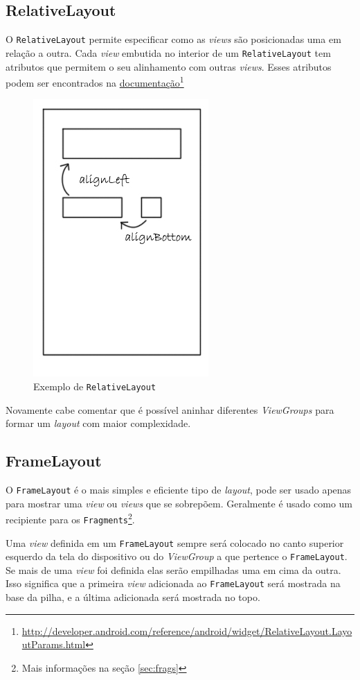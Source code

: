 \documentclass[a4paper,12pt,brazil]{book}
\begin{document}
\begin{singlespace}
\subsection{RelativeLayout}
\label{subsec:relativelayout}

O \texttt{RelativeLayout} permite especificar como as \emph{views} são posicionadas uma em relação a outra. Cada \emph{view} embutida no interior de um \texttt{RelativeLayout} tem atributos que permitem o seu alinhamento com outras \emph{views}. Esses atributos podem ser encontrados na \href{http://developer.android.com/reference/android/widget/RelativeLayout.LayoutParams.html}{documentação}\footnote{ \href{http://developer.android.com/reference/android/widget/RelativeLayout.LayoutParams.html}{http://developer.android.com/reference/android/widget/RelativeLayout.LayoutParams.html}}

\begin{figure}[H]
  \centering
  \includegraphics[width=.25\textwidth]{figuras/design/relativelayout.jpg}
  \caption{Exemplo de \texttt{RelativeLayout}}
  \label{fig:e}
\end{figure}

Novamente cabe comentar que é possível aninhar diferentes \emph{ViewGroups} para formar um \emph{layout} com maior complexidade.

\subsection{FrameLayout}

O \texttt{FrameLayout} é o mais simples e eficiente tipo de \emph{layout}, pode ser usado apenas para mostrar uma \emph{view} ou \emph{views} que se sobrepõem. Geralmente é usado como um recipiente para os \texttt{Fragments}\footnote{Mais informações na seção \ref{sec:frags}}.

Uma \emph{view} definida em um \texttt{FrameLayout} sempre será colocado no canto superior esquerdo da tela do dispositivo ou do \emph{ViewGroup} a que pertence o \texttt{FrameLayout}. Se mais de uma \emph{view} foi definida elas serão empilhadas uma em cima da outra. Isso significa que a primeira \emph{view} adicionada ao \texttt{FrameLayout} será mostrada na base da pilha, e a última adicionada será mostrada no topo.


\end{singlespace}
\end{document}

